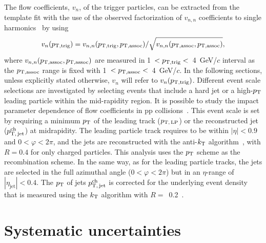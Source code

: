 The flow coefficients, $v_{n}$, of the trigger particles, can be extracted from the template fit with the use of the observed factorization of $v_{n,n}$ coefficients to single harmonics~\cite{ATLAS:2015hzw,ATLAS:2016yzd} by using
\begin{eqnarray}
v_{n}(p_{\rm{T,trig}}) = v_{n,n}(p_{\rm{T,trig}}, p_{\rm{T,assoc}}) / \sqrt{ v_{n,n}(p_{\rm{T,assoc}},p_{\rm{T,assoc}})},
\end{eqnarray}
where $v_{n,n}(p_{\rm{T,assoc}}, p_{\rm{T,assoc}})$ are measured in 1~$<p_{\rm{T,trig}}<$~4~GeV/$c$ interval as the $p_{\rm{T,assoc}}$ range is fixed with 1~$<p_{\rm{T,assoc}}<$~4~GeV/$c$. In the following sections, unless explicitly stated otherwise, $v_n$ will refer to $v_n(p_{\rm{T,trig}})$.
Different event scale selections are investigated by selecting events that include a hard jet or a high-$p_\mathrm{T}$ leading particle within the mid-rapidity region. It is possible to study the impact parameter dependence of flow coefficients in pp collisions~\cite{Sjostrand:1986ep,Frankfurt:2010ea}. This event scale is set by requiring a minimum $p_\mathrm{T}$ of the leading track ($p_\mathrm{T,\,LP}$) or the reconstructed jet ($p_\mathrm{T,\,jet}^\mathrm{ch}$) at midrapidity. The leading particle track requires to be within $|\eta|<0.9$ and $0<\varphi<2\pi$, and the jets are reconstructed with the anti-$k_{\rm{T}}$ algorithm~\cite{Cacciari:2008gp,Cacciari:2011ma}, with $R=0.4$ for only charged particles. This analysis uses the $p_\mathrm{T}$ scheme as the recombination scheme. In the same way, as for the leading particle tracks, the jets are selected in the full azimuthal angle ($0<\varphi<2\pi$) but in an $\eta$-range of $|\eta_\mathrm{jet}|<0.4$. The $p_\mathrm{T}$ of jets $p_\mathrm{T,\,jet}^\mathrm{ch}$ is corrected for the underlying event density that is measured using the $k_{\rm{T}}$ algorithm with $R=$~0.2~\cite{Acharya:2018eat}.


\section{Systematic uncertainties}
\label{sec:uncertainties}

